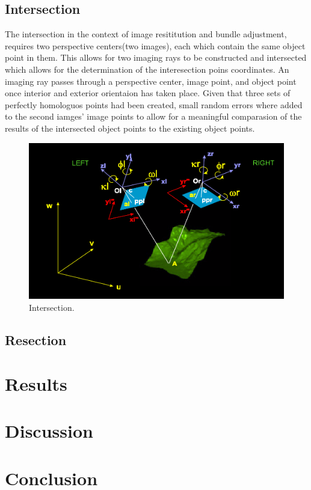 \documentclass{article}
\begin{document}
\subsection{Intersection}
The intersection in the context of image resititution and bundle adjustment, requires two perspective centers(two images),
each which contain the same object point in them.
This allows for two imaging rays to be constructed and intersected which allows for the determination of the interesection poins coordinates.
An imaging ray passes through a perspective center, image point, and object point once interior and exterior orientaion has taken place.
Given that three sets of perfectly homologuos points had been created, small random errors where added to the second iamges' image points
to allow for a meaningful comparasion of the results of the intersected object points to the existing object points.

\begin{figure}[h!]
\centering
\caption{Intersection.}
\includegraphics[scale=0.2]{intersection}
\end{figure}


\subsection{Resection}



\section{Results}

\section{Discussion}

\section{Conclusion}
\end{document}
